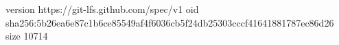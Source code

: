 version https://git-lfs.github.com/spec/v1
oid sha256:5b26ea6e87c1b6ce85549af4f6036cb5f24db25303cccf41641881787ec86d26
size 10714
